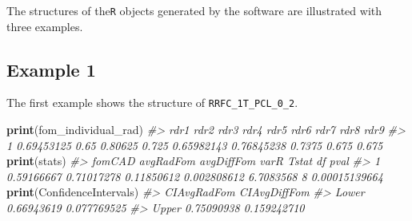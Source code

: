 \documentclass[
]{book}
\newenvironment{Shaded}{\begin{snugshade}}{\end{snugshade}}
\newcommand{\CommentTok}[1]{\textcolor[rgb]{0.56,0.35,0.01}{\textit{#1}}}
\newcommand{\DataTypeTok}[1]{\textcolor[rgb]{0.13,0.29,0.53}{#1}}
\newcommand{\DecValTok}[1]{\textcolor[rgb]{0.00,0.00,0.81}{#1}}
\newcommand{\KeywordTok}[1]{\textcolor[rgb]{0.13,0.29,0.53}{\textbf{#1}}}
\newcommand{\NormalTok}[1]{#1}
\newcommand{\OperatorTok}[1]{\textcolor[rgb]{0.81,0.36,0.00}{\textbf{#1}}}
\newcommand{\StringTok}[1]{\textcolor[rgb]{0.31,0.60,0.02}{#1}}
\begin{document}
The structures of the\texttt{R} objects generated by the software are illustrated with three examples.

\hypertarget{example-1}{%
\subsection{Example 1}\label{example-1}}

The first example shows the structure of \texttt{RRFC\_1T\_PCL\_0\_2}.

\begin{Shaded}
\end{Shaded}

\begin{Shaded}
\begin{Highlighting}[]
\KeywordTok{print}\NormalTok{(fom_individual_rad)}
\CommentTok{#>         rdr1 rdr2    rdr3  rdr4       rdr5       rdr6   rdr7  rdr8  rdr9}
\CommentTok{#> 1 0.69453125 0.65 0.80625 0.725 0.65982143 0.76845238 0.7375 0.675 0.675}
\KeywordTok{print}\NormalTok{(stats)}
\CommentTok{#>       fomCAD  avgRadFom avgDiffFom        varR     Tstat df          pval}
\CommentTok{#> 1 0.59166667 0.71017278 0.11850612 0.002808612 6.7083568  8 0.00015139664}
\KeywordTok{print}\NormalTok{(ConfidenceIntervals)}
\CommentTok{#>       CIAvgRadFom CIAvgDiffFom}
\CommentTok{#> Lower  0.66943619  0.077769525}
\CommentTok{#> Upper  0.75090938  0.159242710}
\end{Highlighting}
\end{Shaded}
\end{document}
